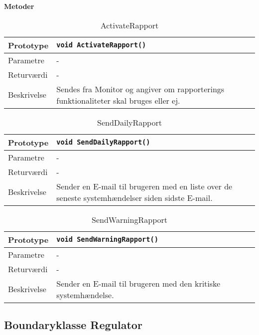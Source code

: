 \textbf{Metoder}

\begin{table}[h]
\begin{tabularx}{\textwidth}{| >{\raggedright\arraybackslash}p{2.5 cm} | >{\raggedright\arraybackslash}X |} \hline
Prototype & \texttt{void ActivateRapport()} \\\hline
Parametre & - \\\hline
Returværdi & - \\\hline
Beskrivelse & Sendes fra Monitor og angiver om rapporterings funktionaliteter skal bruges eller ej. \\\hline
\end{tabularx}
\caption{ActivateRapport}
\label{table:ActivateRapport}
\end{table}

\begin{table}[h]
\begin{tabularx}{\textwidth}{| >{\raggedright\arraybackslash}p{2.5 cm} | >{\raggedright\arraybackslash}X |} \hline
Prototype & \texttt{void SendDailyRapport()} \\\hline
Parametre & - \\\hline
Returværdi & - \\\hline
Beskrivelse & Sender en E-mail til brugeren med en liste over de seneste systemhændelser siden sidste E-mail. \\\hline
\end{tabularx}
\caption{SendDailyRapport}
\label{table:SendDailyRapport}
\end{table}

\begin{table}[h]
\begin{tabularx}{\textwidth}{| >{\raggedright\arraybackslash}p{2.5 cm} | >{\raggedright\arraybackslash}X |} \hline
Prototype & \texttt{void SendWarningRapport()} \\\hline
Parametre & - \\\hline
Returværdi & - \\\hline
Beskrivelse &  Sender en E-mail til brugeren med den kritiske systemhændelse. \\\hline
\end{tabularx}
\caption{SendWarningRapport}
\label{table:SendWarningRapport}
\end{table}

\clearpage

\subsection{Boundaryklasse Regulator}

